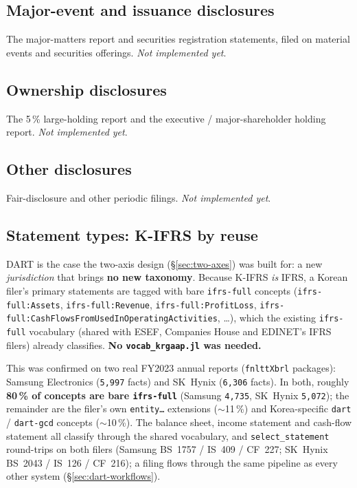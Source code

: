 \documentclass[11pt,a4paper]{report}
\begin{document}
\subsection{Major-event and issuance disclosures}
The major-matters report and securities registration statements, filed on material events and securities
offerings. \emph{Not implemented yet}.

\subsection{Ownership disclosures}
The 5\,\% large-holding report and the executive / major-shareholder holding report. \emph{Not implemented
yet}.

\subsection{Other disclosures}
Fair-disclosure and other periodic filings. \emph{Not implemented yet}.

\subsection{Statement types: K-IFRS by reuse}\label{sec:dart-kifrs}

DART is the case the two-axis design (\S\ref{sec:two-axes}) was built for: a new \emph{jurisdiction} that
brings \textbf{no new taxonomy}. Because K-IFRS \emph{is} IFRS, a Korean filer's primary statements are
tagged with bare \texttt{ifrs-full} concepts (\texttt{ifrs-full:Assets}, \texttt{ifrs-full:Revenue},
\texttt{ifrs-full:ProfitLoss}, \texttt{ifrs-full:CashFlowsFromUsedInOperatingActivities}, \ldots), which
the existing \texttt{ifrs-full} vocabulary (shared with ESEF, Companies House and EDINET's IFRS filers)
already classifies. \textbf{No \texttt{vocab\_krgaap.jl} was needed.}

This was confirmed on two real FY2023 annual reports (\texttt{fnlttXbrl} packages): Samsung Electronics
(\texttt{5{,}997} facts) and SK~Hynix (\texttt{6{,}306} facts). In both, roughly \textbf{80\,\% of
concepts are bare \texttt{ifrs-full}} (Samsung \texttt{4{,}735}, SK~Hynix \texttt{5{,}072}); the remainder
are the filer's own \texttt{entity\ldots} extensions ($\sim$11\,\%) and Korea-specific \texttt{dart} /
\texttt{dart-gcd} concepts ($\sim$10\,\%). The balance sheet, income statement and cash-flow statement all
classify through the shared vocabulary, and \texttt{select\_statement} round-trips on both filers (Samsung
BS~1757 / IS~409 / CF~227; SK~Hynix BS~2043 / IS~126 / CF~216); a filing flows through the same pipeline as
every other system (\S\ref{sec:dart-workflows}).
\end{document}
